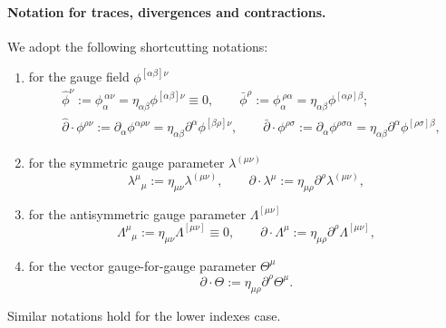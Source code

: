 \documentclass[a4paper,12pt]{article}
\begin{document}
\paragraph{Notation for traces, divergences and contractions.} We adopt the following shortcutting notations:
\begin{enumerate}
    \item for the gauge field $\phi^{[\alpha \beta]\nu}$
\begin{equation}
\begin{aligned}
    &\hat{\phi}^{\nu}:=\phi_{\alpha}^{\ \alpha \nu}=\eta_{\alpha \beta}\phi^{[\alpha \beta] \nu}\equiv0, \qquad \bar{\phi}^{\rho}:=\phi_{\alpha}^{\ \rho \alpha}=\eta_{\alpha \beta}\phi^{[\alpha \rho] \beta};\\
    &\hat{\partial} \cdot \phi^{\rho \nu}:=\partial_{\alpha}\phi^{\alpha \rho \nu}=\eta_{\alpha \beta}\partial^{\alpha} \phi^{[\beta \rho] \nu}, \qquad \bar{\partial} \cdot \phi^{\rho \sigma}:=\partial_{\alpha}\phi^{\rho \sigma \alpha}=\eta_{\alpha \beta}\partial^{\alpha}\phi^{[\rho \sigma] \beta},
    \label{notation}
\end{aligned}
\end{equation}
    \item for the symmetric gauge parameter $\lambda^{(\mu \nu)}$
\begin{equation}
    \lambda^\mu{}_\mu:=\eta_{\mu \nu} \lambda^{(\mu \nu)}, \qquad \partial \cdot \lambda^{\mu}:=\eta_{\mu \rho}\partial^{\rho}\lambda^{(\mu \nu)},
\end{equation}
    \item for the antisymmetric gauge parameter $\Lambda^{[\mu \nu]}$
\begin{equation}
    \Lambda^\mu{}_\mu:=\eta_{\mu \nu} \Lambda^{[\mu \nu]}\equiv 0, \qquad \partial \cdot \Lambda^{\mu}:=\eta_{\mu \rho}\partial^{\rho}\Lambda^{[\mu \nu]},
\end{equation}
    \item for the vector gauge-for-gauge parameter $\Theta^{\mu}$
    \begin{equation}
        \partial \cdot \Theta:=\eta_{\mu \rho}\partial^{\rho}\Theta^{\mu}.
    \end{equation}
\end{enumerate}
Similar notations hold for the lower indexes case.
\end{document}
